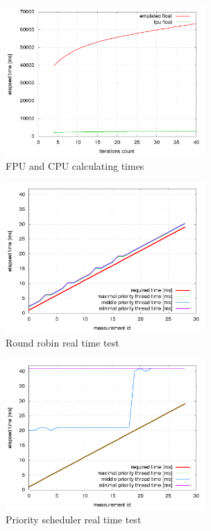 \documentclass[conference]{IEEEtran}
\begin{document}
\begin{figure}[]
\centering
\includegraphics[width=3.0in]{fpu_cpu_performance.png}
\caption{FPU and CPU calculating times}
\label{fig_fpu_cpu}
\end{figure}


\begin{figure}[]
\centering
\includegraphics[width=3.0in]{round_robin_scheduler_perfomance.png}
\caption{Round robin real time test}
\label{fig_round_robin_scheduler_perfomance}
\end{figure}

\begin{figure}[]
\centering
\includegraphics[width=3.0in]{priority_scheduler_perfomance.png}
\caption{Priority scheduler real time test}
\label{fig_priority_scheduler_perfomance}
\end{figure}
\end{document}
